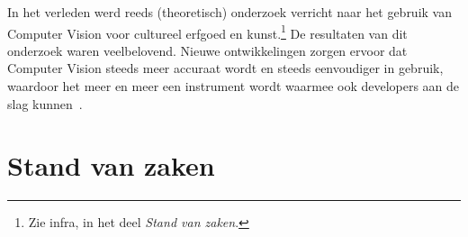 In het verleden werd reeds (theoretisch) onderzoek verricht naar het gebruik van Computer Vision voor cultureel erfgoed en kunst.\footnote{Zie infra, in het deel \emph{Stand van zaken}.} De resultaten van dit onderzoek waren veelbelovend. Nieuwe ontwikkelingen zorgen ervoor dat Computer Vision steeds meer accuraat wordt en steeds eenvoudiger in gebruik, waardoor het meer en meer een instrument wordt waarmee ook developers aan de slag kunnen~\autocite{Hindle2017}.


\section{Stand van zaken}
\label{sec:state-of-the-art}


